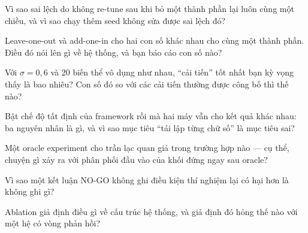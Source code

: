 \documentclass[../../deep_learning.tex]{subfiles}
\begin{document}
\begin{tukiem}
\item Vì sao sai lệch do không re-tune sau khi bỏ một thành phần lại luôn cùng một chiều, và vì sao chạy thêm seed không sửa được sai lệch đó?
\item Leave-one-out và add-one-in cho hai con số khác nhau cho cùng một thành phần. Điều đó nói lên gì về hệ thống, và bạn báo cáo con số nào?
\item Với \(\sigma = 0{,}6\) và 20 biến thể vô dụng như nhau, ``cải tiến'' tốt nhất bạn kỳ vọng thấy là bao nhiêu? Con số đó so với các cải tiến thường được công bố thì thế nào?
\item Bật chế độ tất định của framework rồi mà hai máy vẫn cho kết quả khác nhau: ba nguyên nhân là gì, và vì sao mục tiêu ``tái lập từng chữ số'' là mục tiêu sai?
\item Một oracle experiment cho trần lạc quan giả trong trường hợp nào --- cụ thể, chuyện gì xảy ra với phân phối đầu vào của khối đứng ngay sau oracle?
\item Vì sao một kết luận NO-GO không ghi điều kiện thí nghiệm lại có hại hơn là không ghi gì?
\item Ablation giả định điều gì về cấu trúc hệ thống, và giả định đó hỏng thế nào với một hệ có vòng phản hồi?
\end{tukiem}
\ifSubfilesClassLoaded{\printbibliography[title={Nguồn}]}{}
\end{document}
